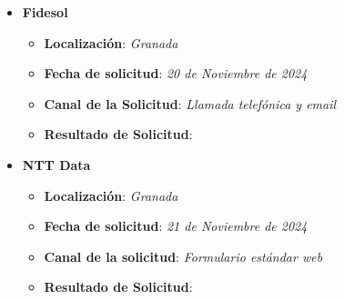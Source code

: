 \begin{itemize}
	\item {\large \textbf{Fidesol}}
	\begin{itemize}
		\item \textbf{Localización}: \textit{Granada}
		\item \textbf{Fecha de solicitud}: \textit{20 de Noviembre de 2024}
		\item \textbf{Canal de la Solicitud}: \textit{Llamada telefónica y email}
		\item \textbf{Resultado de Solicitud}: 
	\end{itemize}
	\item {\large\textbf{NTT Data}}
		\begin{itemize}
		\item \textbf{Localización}: \textit{Granada}
		\item \textbf{Fecha de solicitud}: \textit{21 de Noviembre de 2024}
		\item \textbf{Canal de la solicitud}: \textit{Formulario estándar web}
		\item \textbf{Resultado de Solicitud}: 
	\end{itemize}
	
\end{itemize}







%

